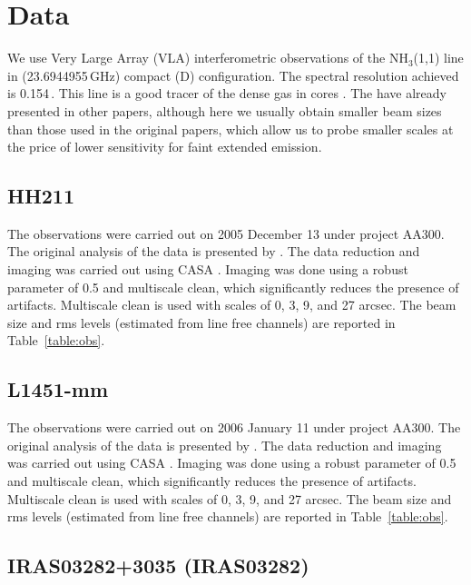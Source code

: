 \section{Data}

We use Very Large Array (VLA) interferometric observations of the NH$_3$(1,1) line in (23.6944955\,GHz)
compact (D) configuration. 
The spectral resolution achieved is 0.154\,\kms. 
This line is a good tracer of the dense gas in cores \cite{Benson_1989,Goodman_1998,Tafalla_2004,Pineda_2010}.
The have already presented in other papers, although here we usually obtain smaller beam sizes than those 
used in the original papers, which allow us to probe smaller scales at the 
price of lower sensitivity for faint extended emission.

\subsection{HH211}
The observations were carried out on 2005 December 13 under project AA300. 
The original analysis of the data is presented by \cite{Tanner_2010}.
The data reduction and imaging was carried out using CASA \cite{2007ASPC..376..127M}. 
Imaging was done using a robust parameter of 0.5 and multiscale clean, which significantly reduces 
the presence of artifacts. 
Multiscale clean is used with scales of 0, 3, 9, and 27 arcsec. 
The beam size and rms levels (estimated from line free channels) are reported in Table~\ref{table:obs}.

\subsection{L1451-mm}
The observations were carried out on 2006 January 11 under project AA300. 
The original analysis of the data is presented by \cite{Pineda_2011}.
The data reduction and imaging was carried out using CASA \cite{2007ASPC..376..127M}. 
Imaging was done using a robust parameter of 0.5 and multiscale clean, which significantly reduces 
the presence of artifacts. 
Multiscale clean is used with scales of 0, 3, 9, and 27 arcsec. 
The beam size and rms levels (estimated from line free channels) are reported in Table~\ref{table:obs}.



\subsection{IRAS03282+3035 (IRAS03282)}

